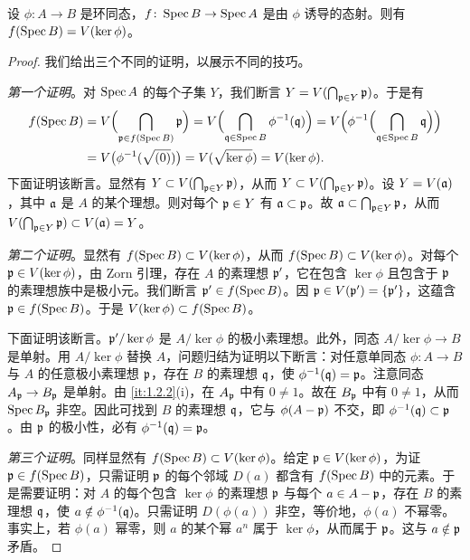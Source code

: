 \begin{lemma}\label{it:1.3.17}
设 $\phi\colon A\to B$ 是环同态，$f\colon \operatorname{Spec} B\to \operatorname{Spec} A$ 是由 $\phi$ 诱导的态射。则有 $f(\operatorname{Spec} B)=V(\ker \phi)$。
\end{lemma}

\begin{proof}
我们给出三个不同的证明，以展示不同的技巧。

\emph{第一个证明}。对 $\operatorname{Spec} A$ 的每个子集 $Y$，我们断言 $Y=V(\bigcap_{\mathfrak{p}\in Y}\mathfrak{p})$。于是有
\[
\begin{aligned}
f(\operatorname{Spec} B)
&=V\Bigl(\bigcap_{\mathfrak{p}\in f(\operatorname{Spec} B)}\mathfrak{p}\Bigr)
=V\Bigl(\bigcap_{\mathfrak{q}\in \operatorname{Spec} B}\phi^{-1}(\mathfrak{q})\Bigr)
=V\Bigl(\phi^{-1}\Bigl(\bigcap_{\mathfrak{q}\in \operatorname{Spec} B}\mathfrak{q}\Bigr)\Bigr)\\
&=V\bigl(\phi^{-1}(\sqrt{(0)})\bigr)=V(\sqrt{\ker\phi})=V(\ker\phi).
\end{aligned}
\]
下面证明该断言。显然有 $Y\subset V(\bigcap_{\mathfrak{p}\in Y}\mathfrak{p})$，从而 $Y\subset V(\bigcap_{\mathfrak{p}\in Y}\mathfrak{p})$。设 $Y=V(\mathfrak{a})$，其中 $\mathfrak{a}$ 是 $A$ 的某个理想。则对每个 $\mathfrak{p}\in Y$ 有 $\mathfrak{a}\subset \mathfrak{p}$。故 $\mathfrak{a}\subset \bigcap_{\mathfrak{p}\in Y}\mathfrak{p}$，从而 $V(\bigcap_{\mathfrak{p}\in Y}\mathfrak{p})\subset V(\mathfrak{a})=Y$。

\emph{第二个证明}。显然有 $f(\operatorname{Spec} B)\subset V(\ker \phi)$，从而 $f(\operatorname{Spec} B)\subset V(\ker \phi)$。对每个 $\mathfrak{p}\in V(\ker \phi)$，由 Zorn 引理，存在 $A$ 的素理想 $\mathfrak{p}'$，它在包含 $\ker \phi$ 且包含于 $\mathfrak{p}$ 的素理想族中是极小元。我们断言 $\mathfrak{p}'\in f(\operatorname{Spec} B)$。因 $\mathfrak{p}\in V(\mathfrak{p}')=\{\mathfrak{p}'\}$，这蕴含 $\mathfrak{p}\in f(\operatorname{Spec} B)$。于是 $V(\ker \phi)\subset f(\operatorname{Spec} B)$。

下面证明该断言。$\mathfrak{p}'/\ker \phi$ 是 $A/\ker \phi$ 的极小素理想。此外，同态 $A/\ker \phi\to B$ 是单射。用 $A/\ker \phi$ 替换 $A$，问题归结为证明以下断言：对任意单同态 $\phi\colon A\to B$ 与 $A$ 的任意极小素理想 $\mathfrak{p}$，存在 $B$ 的素理想 $\mathfrak{q}$，使 $\phi^{-1}(\mathfrak{q})=\mathfrak{p}$。注意同态 $A_{\mathfrak{p}}\to B_{\mathfrak{p}}$ 是单射。由 \ref{it:1.2.2}(i)，在 $A_{\mathfrak{p}}$ 中有 $0\ne 1$。故在 $B_{\mathfrak{p}}$ 中有 $0\ne 1$，从而 $\operatorname{Spec} B_{\mathfrak{p}}$ 非空。因此可找到 $B$ 的素理想 $\mathfrak{q}$，它与 $\phi(A-\mathfrak{p})$ 不交，即 $\phi^{-1}(\mathfrak{q})\subset \mathfrak{p}$。由 $\mathfrak{p}$ 的极小性，必有 $\phi^{-1}(\mathfrak{q})=\mathfrak{p}$。

\emph{第三个证明}。同样显然有 $f(\operatorname{Spec} B)\subset V(\ker \phi)$。给定 $\mathfrak{p}\in V(\ker \phi)$，为证 $\mathfrak{p}\in f(\operatorname{Spec} B)$，只需证明 $\mathfrak{p}$ 的每个邻域 $D(a)$ 都含有 $f(\operatorname{Spec} B)$ 中的元素。于是需要证明：对 $A$ 的每个包含 $\ker \phi$ 的素理想 $\mathfrak{p}$ 与每个 $a\in A-\mathfrak{p}$，存在 $B$ 的素理想 $\mathfrak{q}$，使 $a\notin \phi^{-1}(\mathfrak{q})$。只需证明 $D(\phi(a))$ 非空，等价地，$\phi(a)$ 不幂零。事实上，若 $\phi(a)$ 幂零，则 $a$ 的某个幂 $a^n$ 属于 $\ker \phi$，从而属于 $\mathfrak{p}$。这与 $a\notin \mathfrak{p}$ 矛盾。
\end{proof}
